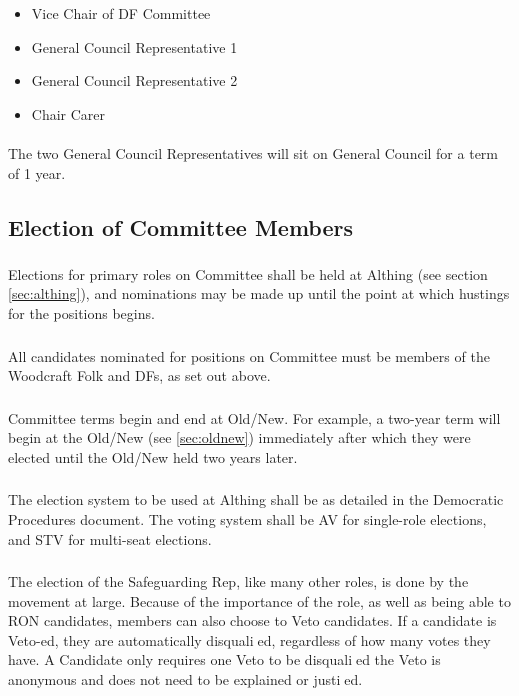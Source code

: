\documentclass[a4paper, 11pt]{report}
\begin{document}
\begin{itemize}
\item Vice Chair of DF Committee
\item General Council Representative 1
\item General Council Representative 2
\item Chair Carer
\end{itemize}

\paragraph{} The two General Council Representatives will sit on General Council for a term of 1 year.

\subsection{Election of Committee Members}
\label{sec:election}
\subsubsection{}
Elections for primary roles on Committee shall be held at Althing (see section \ref{sec:althing}), and nominations may be made up until the point at which hustings for the positions begins.

\subsubsection{}
All candidates nominated for positions on Committee must be members of the Woodcraft Folk and DFs, as set out above.

\subsubsection{}
Committee terms begin and end at Old/New.  For example, a two-year term will begin at the Old/New (see \ref{sec:oldnew}) immediately after which they were elected until the Old/New held two years later.

\subsubsection{}
The election system to be used at Althing shall be as detailed in the Democratic Procedures document.  The voting system shall be AV for single-role elections, and STV for multi-seat elections.

\subsubsection{}
The election of the Safeguarding Rep, like many other roles, is done by the movement at large. Because of the importance of the role, as well as being able to RON candidates, members can also choose to Veto candidates. If a candidate is Veto-ed, they are automatically disqualied, regardless of how many votes they have. A Candidate only requires one Veto to be disqualied the Veto is anonymous and does not need to be explained or justied.
\end{document}
